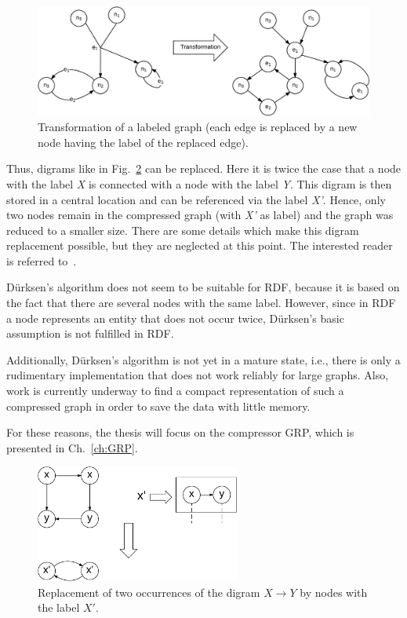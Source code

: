 \begin{figure}[h]
	\centering
	\includegraphics[width=1\textwidth]{figures/relatedwork/transf}
	\caption{Transformation of a labeled graph (each edge is replaced by a new node having the label of the replaced edge).}
	\label{fig:transformation}
\end{figure}

Thus, digrams like in Fig.~\ref{fig:basicdigram} can be replaced. Here it is twice the case that a node with the label \textit{X} is connected with a node with the label \textit{Y}. This digram is then stored in a central location and can be referenced via the label \textit{X'}. Hence, only two nodes remain in the compressed graph (with \textit{X'} as label) and the graph was reduced to a smaller size. There are some details which make  this digram replacement possible, but they are neglected at this point. The interested reader is referred to~\cite{mattdk}.

Dürksen's algorithm does not seem to be suitable for RDF, because it is based on the fact that there are several nodes with the same label. However, since in RDF a node represents an entity that does not occur twice, Dürksen's basic assumption is not fulfilled in RDF.

Additionally, Dürksen's algorithm is not yet in a mature state, i.e., there is only a rudimentary implementation that does not work reliably for large graphs. Also, work is currently underway to find a compact representation of such a compressed graph in order to save the data with little memory.~\cite{mattdk}

For these reasons, the thesis will focus on the compressor GRP, which is presented in Ch.~\ref{ch:GRP}.

\begin{figure}[h]
	\centering
	\includegraphics[width=0.6\textwidth]{figures/relatedwork/basisdigram}
	\caption{Replacement of two occurrences of the digram $X \to Y$ by nodes with the label $X'$.}
	\label{fig:basicdigram}
\end{figure}


